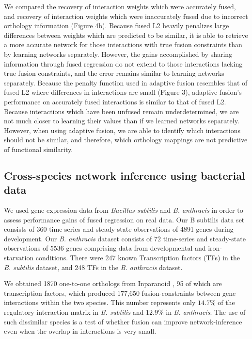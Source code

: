 \documentclass[11pt]{article}
\begin{document}
We compared the recovery of interaction weights which were accurately fused, and recovery of interaction weights which were inaccurately fused due to incorrect orthology information (Figure 4b). Because fused L2 heavily penalizes large differences between weights which are predicted to be similar, it is able to retrieve a more accurate network for those interactions with true fusion constraints than by learning networks separately. However, the gains accomplished by sharing information through fused regression do not extend to those interactions lacking true fusion constraints, and the error remains similar to learning networks separately. Because the penalty function used in adaptive fusion resembles that of fused L2 where differences in interactions are small (Figure 3), adaptive fusion's performance on accurately fused interactions is similar to that of fused L2. Because interactions which have been unfused remain underdetermined, we are not much closer to learning their values than if we learned networks separately. However, when using adaptive fusion, we are able to identify which interactions should not be similar, and therefore, which orthology mappings are not predictive of functional similarity. 


\subsection{Cross-species network inference using bacterial data}
We used gene-expression data from \textit{\textit{Bacillus subtilis}} and \textit{\textit{B. anthracis}} in order to assess performance gains of fused regression on real data. Our B subtilis data set consists of 360 time-series and steady-state observations of 4891 genes during development. Our \textit{\textit{B. anthracis}} dataset consists of 72 time-series and steady-state observations of 5536 genes comprising data from developmental and iron-starvation conditions. There were 247 known Transcription factors (TFs) in the \textit{\textit{B. subtilis}} dataset, and 248 TFs in the \textit{B. anthracis} dataset. 

We obtained 1870 one-to-one orthologs from Inparanoid \cite{ostlund_inparanoid_2010}, 95 of which are transcription factors, which produced 177,650 fusion-constraints between gene interactions within the two species. This number represents only $14.7\%$ of the regulatory interaction matrix in \textit{B. subtilis} and $12.9\%$ in \textit{B. anthracis}. The use of such dissimilar species is a test of whether fusion can improve network-inference even when the overlap in interactions is very small. 
\end{document}
